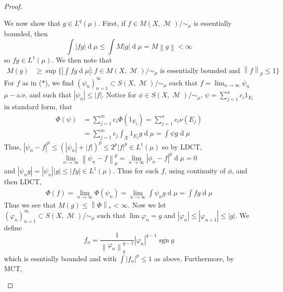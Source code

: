\documentclass[12pt, a4paper]{memoir}
\newcommand{\norm}[1]{\ensuremath{\left\lVert#1\right\rVert}} %
\theoremstyle{nonumberplain}
\newtheorem{proof}{Proof}
\DeclareMathOperator{\M}{\mathcal{M}}
\renewcommand{\d}[1]{\ensuremath{\operatorname{d}\!{#1}}} %
\DeclareMathOperator{\sgn}{sgn}
\begin{document}
\begin{proof}
\begin{enumerate}[label=(\roman*)]
            We now show that $g\in L^q(\mu)$.
            First, if $f\in M(X,\M)/\sim_\mu$ is essentially bounded, then
            \begin{equation*}
                \int|fg|\d{\mu}\leq\int M|g|\d{\mu}=M\norm{g}<\infty
            \end{equation*}
            so $fg\in L^1(\mu)$.
            We then note that
            \begin{align*}
                M(g) &\geq \sup\{\left\lvert\int fg\d{\mu}\right\rvert:f\in M(X,\M)/\sim_\mu\text{ is essentially bounded and }\norm{f}_p\leq 1\}\tag{$*$}
            \end{align*}
            For $f$ as in ($*$), we find $(\psi_n)_{n=1}^\infty\subset S(X,\M)/\sim_\mu$ such that $f=\lim_{n\to\infty}\psi_n$ $\mu-$a.e. and such that $|\psi_n|\leq|f|$.
            Notice for $\phi\in S(X,\M)/\sim_\mu$, $\psi=\sum_{j=1}^n c_i1_{E_i}$ in standard form, that
            \begin{align*}
                \Phi(\psi)&= \sum_{j=1}^m c_i\Phi(1_{E_j})=\sum_{j=1}^n c_i\nu(E_j)\\
                          &=\sum_{j=1}^m c_j\int_X 1_{E_j}g\d{\mu}=\int\psi g\d{\mu}
            \end{align*}
            Thus, $|\psi_n-f|^p\leq(|\psi_n|+|f|)^p\leq 2^p|f|^p\in L^1(\mu)$ so by LDCT,
            \begin{equation*}
                \lim_{n\to\infty}\norm{\psi_n-f}_p^p=\lim_{n\to\infty}|\phi_n-f|^p\d{\mu}=0
            \end{equation*}
            and $|\psi_ng|=|\psi_n||g|\leq|fg|\in L^1(\mu)$.
            Thus for such $f$, using continuity of $\phi$, and then LDCT,
            \begin{align*}
                \Phi(f)=\lim_{n\to\infty}\Phi(\psi_n)=\lim_{n\to\infty}\int\psi_n g\d{\mu}=\int fg\d{\mu}
            \end{align*}
            Thus we see that $M(g)\leq\norm{\Phi}_*<\infty$.
            Now we let $(\varphi_n)_{n=1}^\infty\subset S(X,\M)/\sim_\mu$ such that $\lim\varphi_n=g$ and $|\varphi_n|\leq|\varphi_{n+1}|\leq|g|$.
            We define
            \begin{equation*}
                f_n=\frac{1}{\norm{\varphi_n}_q^{q-1}}|\varphi_n|^{q-1}\overline{\sgn g}
            \end{equation*}
            which is essntially bounded and with $\int|f_n|^p\leq 1$ as above.
            Furthermore, by MCT,
            \begin{equation*}

\end{equation*}
\end{enumerate}
\end{proof}
\end{document}
